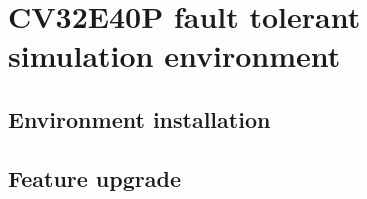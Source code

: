 \chapter{CV32E40P fault tolerant simulation environment}{
	
	
	\section{Environment installation}{
		
	}%
	
	\section{Feature upgrade}{
		
	}%

} %